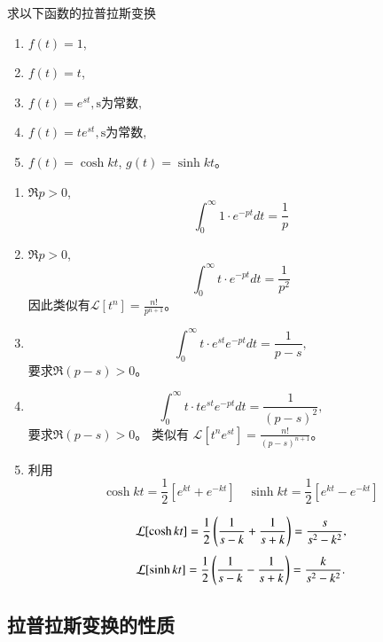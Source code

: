 \begin{examplebox}{求以下函数的拉普拉斯变换
    \begin{enumerate}
        \item $f(t) = 1$,
        \item $f(t) = t$,
        \item $f(t) =e^{s t}, \textrm{s为常数}$,
        \item $f(t) = t e^{s t}, \textrm{s为常数}$,
        \item $f(t) = \cosh {k t}$, $g(t)= \sinh {kt}$。
    \end{enumerate}}

    \begin{enumerate}
        \item $\Re p > 0$, 
            $$\int_{0}^{\infty} 1 \cdot e^{-p t} dt = \frac{1}{p}$$
        \item  $\Re p > 0$, 
            $$\int_{0}^{\infty} t \cdot e^{-p t} dt = \frac{1}{p^2}$$
            因此类似有$\mathcal{L}[t^n] = \frac{n!}{p^{n+1}}$。
        \item $$
            \int_{0}^{\infty} t \cdot e^{s t} e^{-p t} dt = \frac{1}{p-s} , 
        $$
        要求$\Re (p-s) > 0$。
        \item 
        $$
        \int_{0}^{\infty} t \cdot t e^{s t} e^{-p t} dt = \frac{1}{(p-s)^2} ,
        $$
        要求$\Re (p-s) > 0$。  
    类似有 $\mathcal{L}[t^n e^{s t}] = \frac{n!}{(p-s)^{n+1}}$。
        \item 利用
        $$
         \cosh{k t}  = \frac{1}{2} \left[ e^{kt} + e^{-kt}\right] \quad 
         \sinh{k t}  = \frac{1}{2} \left[ e^{kt} - e^{-kt}\right] 
        $$

        $$
        \mathcal{L}[ \cosh{k t} ] = {\frac{1}{2}} \left( \frac{1}{s-k} + \frac{1}{s+k} \right) = \frac{s}{s^2 - k^2} ,
        $$
        $$
        \mathcal{L}[ \sinh{k t} ] = {\frac{1}{2}} \left( \frac{1}{s-k} - \frac{1}{s+k} \right) = \frac{k}{s^2 - k^2} .
        $$
    \end{enumerate}
\end{examplebox}

\subsection{拉普拉斯变换的性质}
